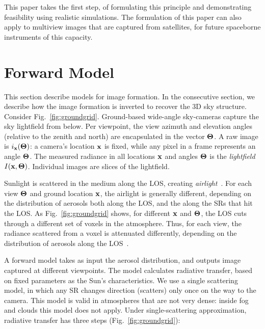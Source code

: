 \documentclass[10pt,twocolumn,letterpaper]{article}
\begin{document}
This paper takes the first step, of formulating this principle and demonstrating feasibility using realistic simulations. The formulation of this paper can also apply to multiview images that are captured from satellites, for future spaceborne instruments of this capacity.


\section{Forward Model}
\label{sec:skymodel} \vspace{-0.2cm}

This section describe models for image formation. In the consecutive section, we describe how the image formation is inverted to recover the 3D sky structure.
Consider Fig.~\ref{fig:groundgrid}.
Ground-based wide-angle sky-cameras capture the sky lightfield from below. Per viewpoint, the view azimuth and elevation angles (relative to the zenith and north) are encapsulated in the vector ${\bf{\Theta}}$.  A raw image is $i_{\bf x}({\bf{\Theta}})$: a camera's location ${\bf x}$ is fixed, while any pixel in a frame represents an angle ${\bf{\Theta}}$.
The measured radiance in all locations ${\bf x}$ and angles ${\bf{\Theta}}$ is the {\em lightfield} $I({\bf x},{\bf{\Theta}})$. Individual images are slices of the lightfield.

Sunlight is scattered in the medium along the LOS, creating {\em airlight}~\cite{fattal,narasimhan2,Hschechner2,tan}. For each view ${\bf{\Theta}}$ and ground location ${\bf x}$, the airlight is generally different, depending on the distribution of aerosols both along the LOS, and the along the SRs that hit the LOS.
As Fig.~\ref{fig:groundgrid} shows, for different ${\bf x}$ and ${\bf{\Theta}}$, the LOS cuts through a different set of voxels in the atmosphere. Thus, for each view, the radiance scattered from a voxel is attenuated differently, depending on the distribution of aerosols along the LOS~\cite{hansen}.

A forward model takes as input the aerosol distribution, and outputs image captured at different viewpoints. The model calculates radiative transfer, based on fixed parameters as the Sun's characteristics. We use a single scattering model, in which any SR changes direction (scatters) only once on the way to the camera. This model is valid in atmospheres that are not very dense: inside fog and clouds this model does not apply. Under single-scattering approximation, radiative transfer has three steps (Fig.~\ref{fig:groundgrid}):\\
\end{document}
